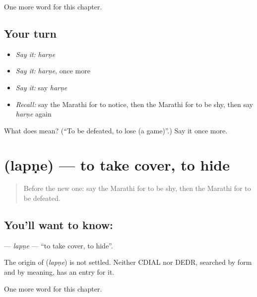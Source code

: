 \begin{grammarlens}[title={What you've built}]
One more word for this chapter.
\end{grammarlens}

\subsection*{Your turn}
\begin{itemize}
\raggedright
  \item \emph{Say it:} \emph{harṇe}
  \item \emph{Say it:} \emph{harṇe}, once more
  \item \emph{Say it:} say \emph{harṇe}
  \item \emph{Recall:} say the Marathi for to notice, then the Marathi for to be shy, then say \emph{harṇe} again
\end{itemize}

\begin{tcolorbox}[breakable,colback=teal!4,colframe=teal!35!black,title={Before you move on}]
What does  mean? (\textquotedblleft{}To be defeated, to lose (a game)\textquotedblright{}.) Say it once more.
\end{tcolorbox}
\section[\texorpdfstring{\mr{लपणे} (lapṇe)}{लपणे (lapṇe)}]{ (lapṇe) — to take cover, to hide}

\label{lesson:MR-C168-lapne}



\begin{quote}
Before the new one: say the Marathi for to be shy, then the Marathi for to be defeated.
\end{quote}

\subsection*{You'll want to know: }
\textbf{} — \emph{lapṇe} — \textquotedblleft{}to take cover, to hide\textquotedblright{}.

\begin{cousinweb}
The origin of \textbf{} (\emph{lapṇe}) is not settled. Neither CDIAL nor DEDR, searched by form and by meaning, has an entry for it.
\end{cousinweb}

\begin{grammarlens}[title={What you've built}]
One more word for this chapter.
\end{grammarlens}

